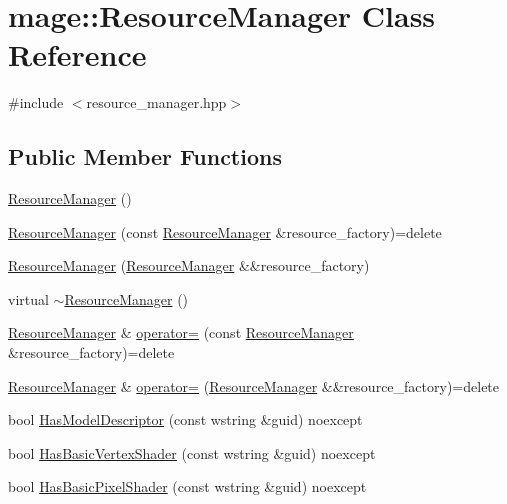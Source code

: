 \hypertarget{classmage_1_1_resource_manager}{}\section{mage\+:\+:Resource\+Manager Class Reference}
\label{classmage_1_1_resource_manager}


{\ttfamily \#include $<$resource\+\_\+manager.\+hpp$>$}

\subsection*{Public Member Functions}
\begin{DoxyCompactItemize}
\item 
\hyperlink{classmage_1_1_resource_manager_a0ff509899a9fbef2096c60b3d3d80bd5}{Resource\+Manager} ()
\item 
\hyperlink{classmage_1_1_resource_manager_a7d61b10f18bb0ea34bc2a1e9920eeb3d}{Resource\+Manager} (const \hyperlink{classmage_1_1_resource_manager}{Resource\+Manager} \&resource\+\_\+factory)=delete
\item 
\hyperlink{classmage_1_1_resource_manager_a7aa3b08f3edd385b48694ae4b301ebba}{Resource\+Manager} (\hyperlink{classmage_1_1_resource_manager}{Resource\+Manager} \&\&resource\+\_\+factory)
\item 
virtual \hyperlink{classmage_1_1_resource_manager_ad4bed85d3656f90072c5d47f50618add}{$\sim$\+Resource\+Manager} ()
\item 
\hyperlink{classmage_1_1_resource_manager}{Resource\+Manager} \& \hyperlink{classmage_1_1_resource_manager_a20dccd5bdf541990ec4db7819adc6cdb}{operator=} (const \hyperlink{classmage_1_1_resource_manager}{Resource\+Manager} \&resource\+\_\+factory)=delete
\item 
\hyperlink{classmage_1_1_resource_manager}{Resource\+Manager} \& \hyperlink{classmage_1_1_resource_manager_a0a418c5753af2b4a0a868801f3145f0a}{operator=} (\hyperlink{classmage_1_1_resource_manager}{Resource\+Manager} \&\&resource\+\_\+factory)=delete
\item 
bool \hyperlink{classmage_1_1_resource_manager_a20913b24e2b86b3c59887f6b071bb020}{Has\+Model\+Descriptor} (const wstring \&guid) noexcept
\item 
bool \hyperlink{classmage_1_1_resource_manager_ab2e83271c42c8250bf0ffe8ec59d5ced}{Has\+Basic\+Vertex\+Shader} (const wstring \&guid) noexcept
\item 
bool \hyperlink{classmage_1_1_resource_manager_a3027058c2b55a131a2070d0f31080c29}{Has\+Basic\+Pixel\+Shader} (const wstring \&guid) noexcept

\end{DoxyCompactItemize}
